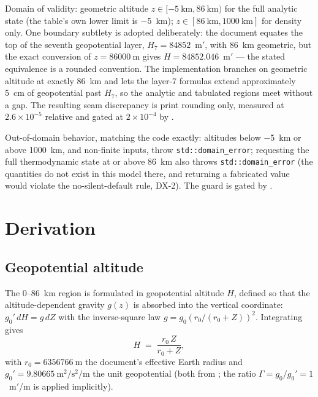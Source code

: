 Domain of validity: geometric altitude
$z \in [\qty{-5}{\kilo\metre}, \qty{86}{\kilo\metre})$ for the full
analytic state (the table's own lower limit is \qty{-5}{\kilo\metre});
$z \in [\qty{86}{\kilo\metre}, \qty{1000}{\kilo\metre}]$ for density only.
One boundary subtlety is adopted deliberately: the document equates the top
of the seventh geopotential layer, $H_7 = 84852$~m$'$, with
\qty{86}{\kilo\metre} geometric, but the exact conversion of
$z = \qty{86000}{\metre}$ gives $H = 84852.046$~m$'$ --- the stated
equivalence is a rounded convention. The implementation branches on
geometric altitude at exactly \qty{86}{\kilo\metre} and lets the layer-7
formulas extend approximately \qty{5}{\centi\metre} of geopotential past
$H_7$, so the analytic and tabulated regions meet without a gap. The
resulting seam discrepancy is print rounding only, measured at
$2.6\times10^{-5}$ relative and gated at $2\times10^{-4}$ by
.

Out-of-domain behavior, matching the code exactly: altitudes below
\qty{-5}{\kilo\metre} or above \qty{1000}{\kilo\metre}, and non-finite
inputs, throw \texttt{std::domain\_error}; requesting the full
thermodynamic state at or above \qty{86}{\kilo\metre} also throws
\texttt{std::domain\_error} (the quantities do not exist in this model
there, and returning a fabricated value would violate the no-silent-default
rule, DX-2). The guard is gated by .

\section{Derivation}
\label{sec:ussa76:derivation}

\subsection{Geopotential altitude}

The 0--\qty{86}{\kilo\metre} region is formulated in geopotential altitude
$H$, defined so that the altitude-dependent gravity $g(z)$ is absorbed into
the vertical coordinate: $g_0'\,dH = g\,dZ$ with the inverse-square law
$g = g_0 (r_0/(r_0+Z))^2$. Integrating gives
\cite[Part~1, eq.~18]{ussa1976}
\begin{equation}
  H \;=\; \frac{r_0\,Z}{r_0 + Z},
  \label{eq:ussa76:geopotential}
\end{equation}
with $r_0 = \qty{6356766}{\metre}$ the document's effective Earth radius
and $g_0' = \qty{9.80665}{\metre\squared\per\second\squared\per\metre}$ the
unit geopotential (both from \cite[Part~1, Table~2]{ussa1976}; the ratio
$\Gamma = g_0/g_0' = 1$~m$'$/m is applied implicitly).

